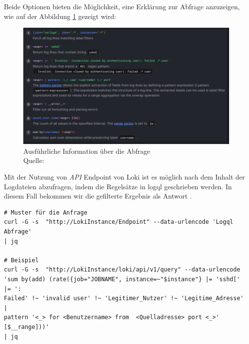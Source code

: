 \newpage
Beide Optionen bieten die Möglichkeit, eine Erklärung zur Abfrage anzuzeigen, wie auf der Abbildung \ref{fig:Loki_CodeInformation} gezeigt wird:
\begin{figure}[H]
   \centering
   \includegraphics[width=1\textwidth]{assets/erklaerungLoki.png}
   \caption[Ausführliche Information über die Abfrage]
   {Ausführliche Information über die Abfrage\\Quelle: \citep{Grafana_QueryEditor}}
   \label{fig:Loki_CodeInformation}
   \centering
\end{figure}

Mit der Nutzung von \textit{\gls{API}} \gls{Endpoint} von Loki ist es möglich nach dem Inhalt der Logdateien abzufragen, indem die Regelsätze in \gls{logql} geschrieben werden. In diesem Fall bekommen wir die gefilterte Ergebnis als Antwort \citep{Grafana_api}.

{
\begin{Verbatim}[fontsize=\small, frame=single]
# Muster für die Anfrage
curl -G -s  "http://LokiInstance/Endpoint" --data-urlencode 'Logql Abfrage' 
| jq

# Beispiel
curl -G -s  "http://LokiInstance/loki/api/v1/query" --data-urlencode
'sum by(add) (rate({job="JOBNAME", instance=~"$instance"} |= 'sshd[' |= ': 
Failed' !~ 'invalid user' !~ 'Legitimer_Nutzer' !~ 'Legitime_Adresse' |
pattern '<_> for <Benutzername> from  <Quelladresse> port <_>' [$__range]))' 
| jq
\end{Verbatim}
}


